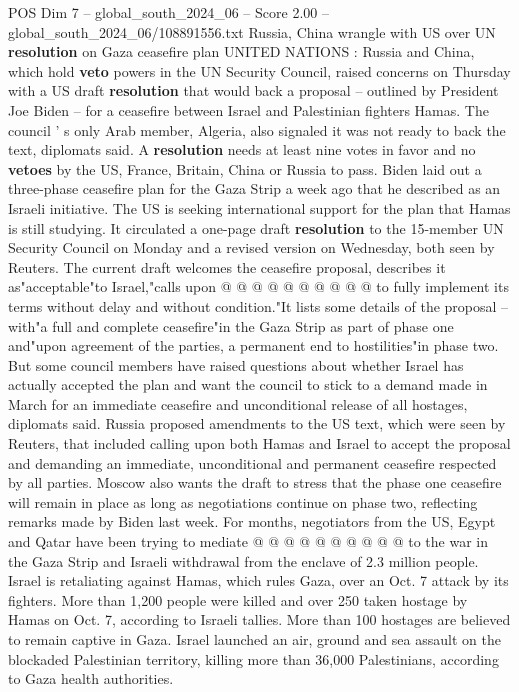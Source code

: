 \begin{textsample}{POS Dim 7 – global\_south\_2024\_06 – Score 2.00 – global\_south\_2024\_06/108891556.txt}  \label{ex:f7_pos_084}
Russia, China wrangle with US over UN \textbf{resolution} on Gaza ceasefire plan UNITED NATIONS : Russia and China, which hold \textbf{veto} powers in the UN Security Council, raised concerns on Thursday with a US draft \textbf{resolution} that would back a proposal -- outlined by President Joe Biden -- for a ceasefire between Israel and Palestinian fighters Hamas.
The council ' s only Arab member, Algeria, also signaled it was not ready to back the text, diplomats said.
A \textbf{resolution} needs at least nine votes in favor and no \textbf{vetoes} by the US, France, Britain, China or Russia to pass.
Biden laid out a three-phase ceasefire plan for the Gaza Strip a week ago that he described as an Israeli initiative.
The US is seeking international support for the plan that Hamas is still studying.
It circulated a one-page draft \textbf{resolution} to the 15-member UN Security Council on Monday and a revised version on Wednesday, both seen by Reuters.
The current draft welcomes the ceasefire proposal, describes it as"acceptable"to Israel,"calls upon @ @ @ @ @ @ @ @ @ @ to fully implement its terms without delay and without condition."It lists some details of the proposal -- with"a full and complete ceasefire"in the Gaza Strip as part of phase one and"upon agreement of the parties, a permanent end to hostilities"in phase two.
But some council members have raised questions about whether Israel has actually accepted the plan and want the council to stick to a demand made in March for an immediate ceasefire and unconditional release of all hostages, diplomats said.
Russia proposed amendments to the US text, which were seen by Reuters, that included calling upon both Hamas and Israel to accept the proposal and demanding an immediate, unconditional and permanent ceasefire respected by all parties.
Moscow also wants the draft to stress that the phase one ceasefire will remain in place as long as negotiations continue on phase two, reflecting remarks made by Biden last week.
For months, negotiators from the US, Egypt and Qatar have been trying to mediate @ @ @ @ @ @ @ @ @ @ to the war in the Gaza Strip and Israeli withdrawal from the enclave of 2.3 million people.
Israel is retaliating against Hamas, which rules Gaza, over an Oct. 7 attack by its fighters.
More than 1,200 people were killed and over 250 taken hostage by Hamas on Oct. 7, according to Israeli tallies.
More than 100 hostages are believed to remain captive in Gaza.
Israel launched an air, ground and sea assault on the blockaded Palestinian territory, killing more than 36,000 Palestinians, according to Gaza health authorities.

\end{textsample}
